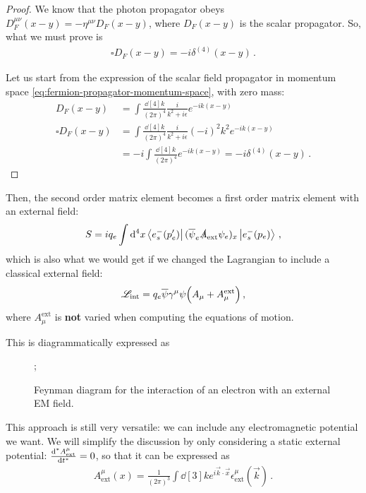 \documentclass[main.tex]{subfiles}
\begin{document}
\begin{proof}
We know that the photon propagator obeys \(D_F^{\mu \nu }(x-y) = - \eta^{\mu \nu } D_F (x-y)\), where \(D_F(x-y)\) is the scalar propagator. So, what we must prove is 
%
\begin{align}
\square D_F(x-y) = -i \delta^{(4)} (x-y)
\,.
\end{align}

Let us start from the expression of the scalar field propagator in momentum space \eqref{eq:fermion-propagator-momentum-space}, with zero mass: 
%
\begin{align}
D_F (x-y) &= \int \frac{ \dd[4]{k}}{(2\pi )^{4}} \frac{i}{k^2+ i \epsilon } e^{-ik (x-y)} \\
\square D_F (x-y) &= \int \frac{ \dd[4]{k}}{(2\pi )^{4}} \frac{i}{k^2+ i \epsilon } (-i)^2 k^2 e^{-ik (x-y)}  \\
&= - i \int \frac{\dd[4]{k}}{(2\pi )^{4}} e^{-ik(x-y)} = - i \delta^{(4)}(x-y)
\,.
\end{align}
\end{proof}

Then, the second order matrix element becomes a first order matrix element with an external field: 
%
\begin{align}
S = i q_e \int \dd[4]{x}
\bra{e^{-}_{s} (p'_e)} 
(\overline{\psi}_{e} \slashed{A} _{\text{ext}} \psi_{e})_x 
\ket{e^{-}_{s}(p_e)}
\,,
\end{align}
%
which is also what we would get if we changed the Lagrangian to include a classical external field: 
%
\begin{align}
\mathscr{L} _{\text{int}} = q_e \overline{\psi} \gamma^{\mu } \psi \qty(A_{\mu} + A_{\mu }^{\text{ext}})
\,,
\end{align}
%
where \(A_{\mu }^{\text{ext}}\) is \textbf{not} varied when computing the equations of motion. 

This is diagrammatically expressed as 
\begin{figure}[ht]
\centering
{};
\caption{Feynman diagram for the interaction of an electron with an external EM field.}
\label{fig:external-EM-field-diagram}
\end{figure}

This approach is still very versatile: we can include any electromagnetic potential we want. 
We will simplify the discussion by only considering a static external potential: \(\dv[*]{A^{\mu } _{\text{ext}}}{t} = 0\), so that it can be expressed as 
%
\begin{align}
A^{\mu } _{\text{ext}} (x) = \frac{1}{(2\pi )^3} \int \dd[3]{k} e^{i \vec{k} \cdot \vec{x}} \epsilon^{\mu } _{\text{ext}} (\vec{k})
\,.
\end{align}
\end{document}
